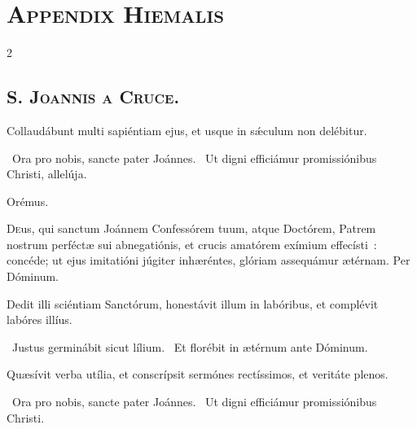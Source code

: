 \documentclass[9pt,twoside]{extarticle}
\begin{document}
\section*{\center \textsc{Appendix Hiemalis}\\ \large \textit{}}
\begin{multicols}{2} %
\subsection*{\center {}}
\subsubsection*{\center {}}
\subsection*{\center \textsc{S. Joannis a Cruce.}}

\begin{tightlist}{}
\item {} 
\item {} Collaudábunt multi sapiéntiam ejus, et usque in sǽculum non delébitur.
\item {}~Ora pro nobis, sancte pater Joánnes. ~Ut digni efficiámur promissiónibus Christi, allelúja.
\item Orémus. \hfill {}
\end{tightlist}
\lettrine{D}eus, qui sanctum Joánnem Confessórem tuum, atque Doctórem, Patrem nostrum perféctæ sui abnegatiónis, et crucis amatórem exímium effecísti~: concéde; ut ejus imitatióni júgiter inhæréntes, glóriam assequámur ætérnam. Per Dóminum.

\begin{tightlist}{}
\item {} Dedit illi sciéntiam Sanctórum, honestávit illum in labóribus, et complévit labóres illíus.
\item {}~Justus germinábit sicut lílium. ~Et florébit in ætérnum ante Dóminum.
\item {} Quæsívit verba utília, et conscrípsit sermónes rectíssimos, et veritáte plenos.
\item {}~Ora pro nobis, sancte pater Joánnes. ~Ut digni efficiámur promissiónibus Christi.
\end{tightlist}


\end{multicols}
\end{document}
